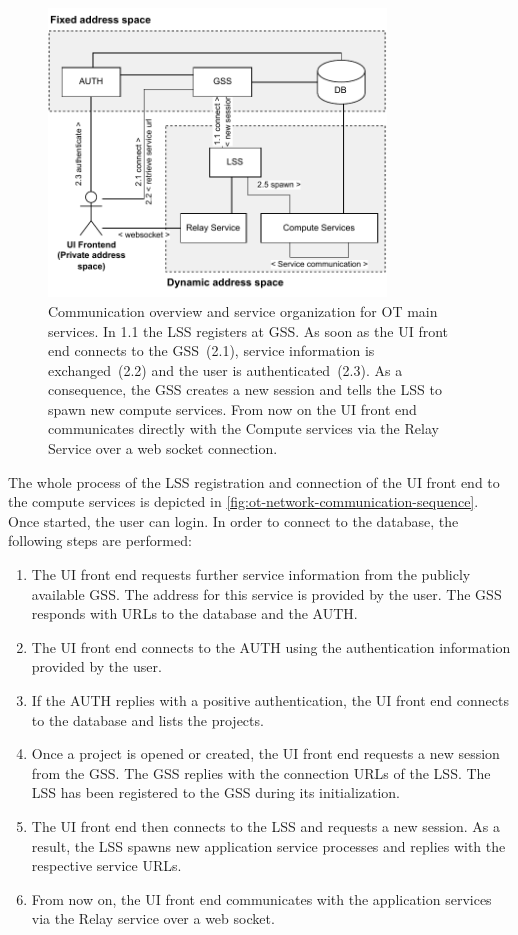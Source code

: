 \begin{figure}[ht]
	\centering
	\includegraphics[width=0.8\textwidth]{Figures/opentwin-network-communication-diagram.pdf}
	\caption{Communication overview and service organization for \ac{OT} main services. In 1.1 the \ac{LSS} registers at \ac{GSS}. As soon as the \ac{UI} front end connects to the \ac{GSS}~(2.1), service information is exchanged~(2.2) and the user is authenticated~(2.3). As a consequence, the \ac{GSS} creates a new session and tells the \ac{LSS} to spawn new compute services. From now on the \ac{UI} front end communicates directly with the Compute services via the Relay Service over a web socket connection.}
	\label{fig:ot-network-communication-diagram}
\end{figure}


The whole process of the \ac{LSS} registration and connection of the \ac{UI} front end to the compute services is depicted in \autoref{fig:ot-network-communication-sequence}.
Once started, the user can login. In order to connect to the database, the following steps are performed:
\begin{enumerate}
\item The \ac{UI} front end requests further service information from the publicly available \ac{GSS}. The address for this service is provided by the user. The \ac{GSS} responds with \acp{URL} to the database and the \ac{AUTH}.
\item The \ac{UI} front end connects to the \ac{AUTH} using the authentication information provided by the user.
\item If the \ac{AUTH} replies with a positive authentication, the \ac{UI} front end connects to the database and lists the projects.
\item Once a project is opened or created, the \ac{UI} front end requests a new session from the \ac{GSS}. The \ac{GSS} replies with the connection \acp{URL} of the \ac{LSS}. The \ac{LSS} has been registered to the \ac{GSS} during its initialization.
\item The \ac{UI} front end then connects to the \ac{LSS} and requests a new session. As a result, the \ac{LSS} spawns new application service processes and replies with the respective service \acp{URL}.
\item From now on, the \ac{UI} front end communicates with the application services via the Relay service over a web socket.
\end{enumerate}

